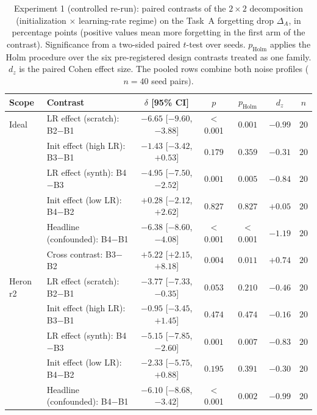 \begin{table}[ht]
\centering
\footnotesize
\setlength{\tabcolsep}{3pt}
\caption{Experiment 1 (controlled re-run): paired contrasts of the $2{\times}2$ decomposition (initialization $\times$ learning-rate regime) on the Task~A forgetting drop $\Delta_A$, in percentage points (positive values mean more forgetting in the first arm of the contrast). Significance from a two-sided paired $t$-test over seeds. $p_{\text{Holm}}$ applies the Holm procedure over the six pre-registered design contrasts treated as one family. $d_z$ is the paired Cohen effect size. The pooled rows combine both noise profiles ($n=40$ seed pairs).}
\label{tab:exp1_contrasts}
\begin{tabular}{llccccc}
\toprule
Scope & Contrast & $\delta$ [95\% CI] & $p$ & $p_{\text{Holm}}$ & $d_z$ & $n$ \\
\midrule
Ideal & LR effect (scratch): B2$-$B1 & $-6.65$ [$-9.60$, $-3.88$] & $<$0.001 & $0.001$ & $-0.99$ & $20$ \\
 & Init effect (high LR): B3$-$B1 & $-1.43$ [$-3.42$, $+0.53$] & $0.179$ & $0.359$ & $-0.31$ & $20$ \\
 & LR effect (synth): B4$-$B3 & $-4.95$ [$-7.50$, $-2.52$] & $0.001$ & $0.005$ & $-0.84$ & $20$ \\
 & Init effect (low LR): B4$-$B2 & $+0.28$ [$-2.12$, $+2.62$] & $0.827$ & $0.827$ & $+0.05$ & $20$ \\
 & Headline (confounded): B4$-$B1 & $-6.38$ [$-8.60$, $-4.08$] & $<$0.001 & $<$0.001 & $-1.19$ & $20$ \\
 & Cross contrast: B3$-$B2 & $+5.22$ [$+2.15$, $+8.18$] & $0.004$ & $0.011$ & $+0.74$ & $20$ \\
\midrule
Heron r2 & LR effect (scratch): B2$-$B1 & $-3.77$ [$-7.33$, $-0.35$] & $0.053$ & $0.210$ & $-0.46$ & $20$ \\
 & Init effect (high LR): B3$-$B1 & $-0.95$ [$-3.45$, $+1.45$] & $0.474$ & $0.474$ & $-0.16$ & $20$ \\
 & LR effect (synth): B4$-$B3 & $-5.15$ [$-7.85$, $-2.60$] & $0.001$ & $0.007$ & $-0.83$ & $20$ \\
 & Init effect (low LR): B4$-$B2 & $-2.33$ [$-5.75$, $+0.88$] & $0.195$ & $0.391$ & $-0.30$ & $20$ \\
 & Headline (confounded): B4$-$B1 & $-6.10$ [$-8.68$, $-3.42$] & $<$0.001 & $0.002$ & $-0.99$ & $20$ \\

\end{tabular}
\end{table}
